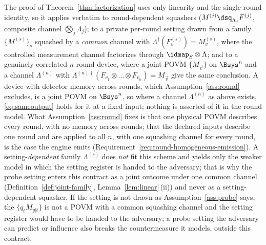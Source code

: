 
\begin{remark}\label{rem:variants}
The proof of Theorem~\ref{thm:factorization} uses only linearity and the
single-round identity, so it applies verbatim to round-dependent squashers
($M^{(j)}\dsq_{\Lambda_j}F^{(j)}$, composite channel
$\bigotimes_j\Lambda_j$); to a private per-round setting drawn from a family
$\{M^{(s)}\}_s$ squashed by a \emph{common} channel with
$\Lambda^{\dagger}(F^{(s)}_v)=M^{(s)}_v$, where the controlled measurement
channel factorizes through $\idmap_S\otimes\Lambda$; and to a genuinely
correlated $n$-round device, where a joint POVM $\{M_{\vec v}\}$ on
$\Bsys^{n}$ and a channel $\Lambda^{(n)}$ with
$\Lambda^{(n)\dagger}(F_{v_1}\otimes\dots\otimes F_{v_n})=M_{\vec v}$ give the
same conclusion. A device with detector memory across rounds, which
Assumption~\ref{ass:round} excludes, is a joint POVM on $\Bsys^{n}$, so
where a channel $\Lambda^{(n)}$ as above exists, \eqref{eq:sameoutput} holds
for it at a fixed input; nothing is asserted of it in the round model. What
Assumption~\ref{ass:round} fixes is that one physical POVM describes every
round, with no memory across rounds; that the declared inputs describe one
round and are applied to all $n$, with one squashing channel for every round,
is the case the engine emits
(Requirement~\ref{req:round-homogeneous-emission}).
A setting-\emph{dependent} family $\Lambda^{(s)}$ does
\emph{not} fit this scheme and yields only the weaker model in which the
setting register is handed to the adversary; that is why the probe setting
enters this contract as a joint outcome under one common channel
(Definition~\ref{def:joint-family}, Lemma~\ref{lem:linear}\,(ii)) and never as
a setting-dependent squasher. If the setting is not drawn as
Assumption~\ref{ass:probe} says, the  $\{q_tM_{y|t}\}$ is not a
POVM with a common squashing channel and the setting register would have to
be handed to the adversary; a probe setting the adversary can predict or
influence also breaks the countermeasure it models, outside this contract.
\end{remark}
